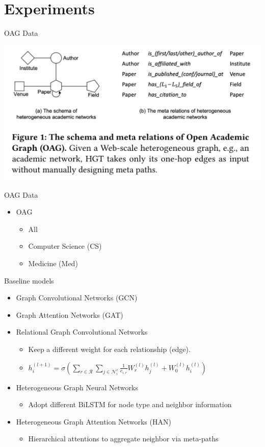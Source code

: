 \documentclass[aspectratio=1610,hyperref={colorlinks,unicode,linkcolor=blue,anchorcolor=blue,citecolor=blue,filecolor=black,urlcolor=blue}]{beamer}
\begin{document}
\section{Experiments}
\label{sec:orgb08a254}

\begin{frame}[label={sec:org4314065}]{OAG Data}
\begin{center}
\includegraphics[width=.9\linewidth]{./p9.png}
\end{center}
\end{frame}

\begin{frame}[label={sec:orge41607b}]{OAG Data}
\begin{itemize}
\item OAG
\begin{itemize}
\item All
\item Computer Science (CS)
\item Medicine (Med)
\end{itemize}
\end{itemize}
\end{frame}

\begin{frame}[label={sec:org7d628d4}]{Baseline models}
\begin{itemize}
\item Graph Convolutional Networks (GCN)
\item Graph Attention Networks (GAT)
\item Relational Graph Convolutional Networks
\begin{itemize}
\item Keep a different weight for each relationship (edge).
\item \(h_{i}^{(l+1)}=\sigma\left(\sum_{r \in \mathcal{R}} \sum_{j \in\mathcal{N}_{i}^{r}} \frac{1}{c_{i, r}} W_{r}^{(l)}h_{j}^{(l)}+W_{0}^{(l)} h_{i}^{(l)}\right)\)
\end{itemize}
\item Heterogeneous Graph Neural Networks
\begin{itemize}
\item Adopt different BiLSTM for node type and neighbor information
\end{itemize}
\item Heterogeneous Graph Attention Networks (HAN)
\begin{itemize}
\item Hierarchical attentions to aggregate neighbor via meta-paths
\end{itemize}
\end{itemize}
\end{frame}
\end{document}
